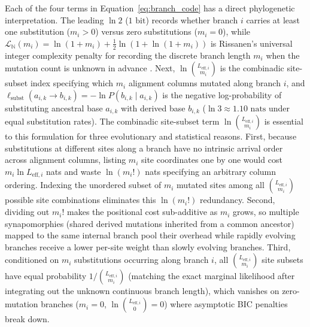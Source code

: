 \documentclass[11pt,a4paper]{article}
\begin{document}
Each of the four terms in Equation~\eqref{eq:branch_code} has a direct phylogenetic interpretation. The leading $\ln 2$ ($1\text{ bit}$) records whether branch $i$ carries at least one substitution ($m_i > 0$) versus zero substitutions ($m_i = 0$), while $\mathcal{L}_{\mathbb{N}}(m_i) = \ln(1 + m_i) + \frac{1}{2}\ln(1 + \ln(1 + m_i))$ is Rissanen's universal integer complexity penalty for recording the discrete branch length $m_i$ when the mutation count is unknown in advance \citep{rissanen1983universal}. Next, $\ln\binom{L_{\text{eff}, i}}{m_i}$ is the combinadic site-subset index specifying which $m_i$ alignment columns mutated along branch $i$, and $\ell_{\text{subst}}(a_{i,k} \to b_{i,k}) = -\ln P(b_{i,k} \mid a_{i,k})$ is the negative log-probability of substituting ancestral base $a_{i,k}$ with derived base $b_{i,k}$ ($\ln 3 \approx 1.10\text{ nats}$ under equal substitution rates). The combinadic site-subset term $\ln\binom{L_{\text{eff}, i}}{m_i}$ is essential to this formulation for three evolutionary and statistical reasons. First, because substitutions at different sites along a branch have no intrinsic arrival order across alignment columns, listing $m_i$ site coordinates one by one would cost $m_i\ln L_{\text{eff}, i}$ nats and waste $\ln(m_i!)$ nats specifying an arbitrary column ordering. Indexing the unordered subset of $m_i$ mutated sites among all $\binom{L_{\text{eff}, i}}{m_i}$ possible site combinations eliminates this $\ln(m_i!)$ redundancy. Second, dividing out $m_i!$ makes the positional cost sub-additive as $m_i$ grows, so multiple synapomorphies (shared derived mutations inherited from a common ancestor) mapped to the same internal branch pool their overhead while rapidly evolving branches receive a lower per-site weight than slowly evolving branches. Third, conditioned on $m_i$ substitutions occurring along branch $i$, all $\binom{L_{\text{eff}, i}}{m_i}$ site subsets have equal probability $1/\binom{L_{\text{eff}, i}}{m_i}$ (matching the exact marginal likelihood after integrating out the unknown continuous branch length), which vanishes on zero-mutation branches ($m_i = 0$, $\ln\binom{L_{\text{eff}, i}}{0} = 0$) where asymptotic BIC penalties break down.
\end{document}
